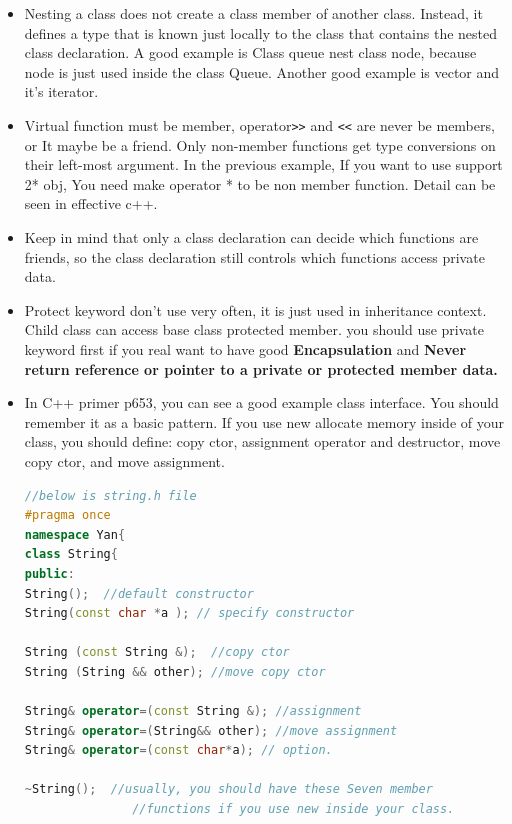 \documentclass[a4paper,12pt,twoside]{book}
\begin{document}
\begin{itemize}

\item Nesting a class does not create a class member of another class. Instead, it defines a type that is known just locally to the class that contains the nested class declaration.  A good example is Class queue nest class node,  because node is just used inside the class Queue. Another good example is vector and it's iterator.

\item Virtual function must be member, operator\verb=>>= and \verb=<<= are never be members, or It maybe be a friend. Only non-member functions get type conversions on their left-most argument.  In the previous example, If you want to use support 2* obj, You need make operator * to be non member function.  Detail can be seen in effective c++.

 \item Keep in mind that only a class declaration can decide which functions are friends, so the class declaration still controls which functions access private data.

 \item Protect keyword don't use very often, it is just used in inheritance context. Child class can access base class protected member. you should use private keyword first if you real want to have good \textbf{Encapsulation} and \textbf{Never return reference or pointer to a private or protected member data.}

\item In C++ primer p653, you can see a good example class interface. You should remember it as a basic pattern.  If you use new allocate memory inside of your class, you should define: copy ctor, assignment operator and destructor, move copy ctor, and move assignment.

\begin{lstlisting}[frame=single, language=c++]
//below is string.h file
#pragma once
namespace Yan{
class String{
public:
String();  //default constructor
String(const char *a ); // specify constructor

String (const String &);  //copy ctor
String (String && other); //move copy ctor

String& operator=(const String &); //assignment
String& operator=(String&& other); //move assignment
String& operator=(const char*a); // option.

~String();  //usually, you should have these Seven member
               //functions if you use new inside your class.


\end{lstlisting}
\end{itemize}
\end{document}
